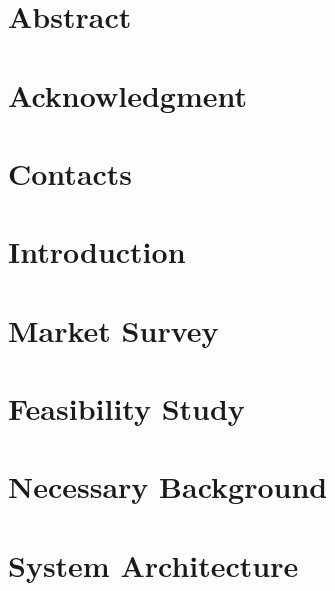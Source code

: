 \documentclass[12pt,twoside]{report}
\begin{document}
	
	
	
	\chapter*{Abstract}
	
	
	
	\chapter*{Acknowledgment}
	
	
	
	\chapter*{Contacts}
	


	\tableofcontents
	\listoffigures
	\listoftables
	\clearpage	%
	\pagestyle{fancy}
	
	
	\chapter{Introduction}
	
	
	\chapter{Market Survey}
	
	
	\chapter{Feasibility Study}
	
	
	\chapter{Necessary Background}
	
	
	\chapter{System Architecture}
	
	
\end{document}

